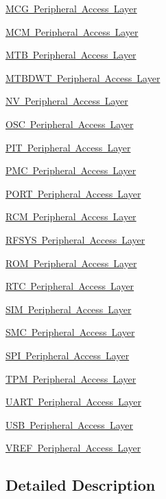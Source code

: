 \begin{DoxyCompactItemize}
\item 
\mbox{\hyperlink{group___m_c_g___peripheral___access___layer}{M\+C\+G Peripheral Access Layer}}
\item 
\mbox{\hyperlink{group___m_c_m___peripheral___access___layer}{M\+C\+M Peripheral Access Layer}}
\item 
\mbox{\hyperlink{group___m_t_b___peripheral___access___layer}{M\+T\+B Peripheral Access Layer}}
\item 
\mbox{\hyperlink{group___m_t_b_d_w_t___peripheral___access___layer}{M\+T\+B\+D\+W\+T Peripheral Access Layer}}
\item 
\mbox{\hyperlink{group___n_v___peripheral___access___layer}{N\+V Peripheral Access Layer}}
\item 
\mbox{\hyperlink{group___o_s_c___peripheral___access___layer}{O\+S\+C Peripheral Access Layer}}
\item 
\mbox{\hyperlink{group___p_i_t___peripheral___access___layer}{P\+I\+T Peripheral Access Layer}}
\item 
\mbox{\hyperlink{group___p_m_c___peripheral___access___layer}{P\+M\+C Peripheral Access Layer}}
\item 
\mbox{\hyperlink{group___p_o_r_t___peripheral___access___layer}{P\+O\+R\+T Peripheral Access Layer}}
\item 
\mbox{\hyperlink{group___r_c_m___peripheral___access___layer}{R\+C\+M Peripheral Access Layer}}
\item 
\mbox{\hyperlink{group___r_f_s_y_s___peripheral___access___layer}{R\+F\+S\+Y\+S Peripheral Access Layer}}
\item 
\mbox{\hyperlink{group___r_o_m___peripheral___access___layer}{R\+O\+M Peripheral Access Layer}}
\item 
\mbox{\hyperlink{group___r_t_c___peripheral___access___layer}{R\+T\+C Peripheral Access Layer}}
\item 
\mbox{\hyperlink{group___s_i_m___peripheral___access___layer}{S\+I\+M Peripheral Access Layer}}
\item 
\mbox{\hyperlink{group___s_m_c___peripheral___access___layer}{S\+M\+C Peripheral Access Layer}}
\item 
\mbox{\hyperlink{group___s_p_i___peripheral___access___layer}{S\+P\+I Peripheral Access Layer}}
\item 
\mbox{\hyperlink{group___t_p_m___peripheral___access___layer}{T\+P\+M Peripheral Access Layer}}
\item 
\mbox{\hyperlink{group___u_a_r_t___peripheral___access___layer}{U\+A\+R\+T Peripheral Access Layer}}
\item 
\mbox{\hyperlink{group___u_s_b___peripheral___access___layer}{U\+S\+B Peripheral Access Layer}}
\item 
\mbox{\hyperlink{group___v_r_e_f___peripheral___access___layer}{V\+R\+E\+F Peripheral Access Layer}}
\end{DoxyCompactItemize}


\subsection{Detailed Description}
